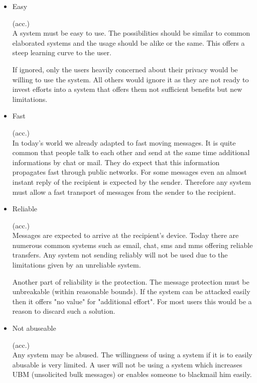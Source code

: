 \documentclass[12pt,journal,compsoc]{IEEEtran}
\begin{document}
\makeatletter
\newcommand{\enumitem}[2]{\item{#2}\hfill\addtocounter{enumi}{1}(\entPrefix.\theenumi)\\}%
\newcommand{\enumref}[1]{\ref{itm:#1}}
\newenvironment{entity}[1]{\def\entPrefix{#1}\setcounter{enumi}{0}\begin{itemize}\itemsep5pt}{\end{itemize}}
\makeatother

\begin{entity}{acc}
	\enumitem{easy}{Easy}
	      A system must be easy to use. The possibilities should be similar to common elaborated systems and the usage should be alike or the same. This offers a steep learning curve to the user.\par
	      If ignored, only the users heavily concerned about their privacy would be willing to use the system. All others would ignore it as they are not ready to invest efforts into a system that offers them not sufficient benefits but new limitations.
	\enumitem{fast}{Fast}
	      In today's world we already adapted to fast moving messages. It is quite common that people talk to each other and send at the same time additional informations by chat or mail. They do expect that this information propagates fast through public networks. For some messages even an almost instant reply of the recipient is expected by the sender. Therefore any system must allow a fast transport of messages from the sender to the recipient.
	\enumitem{reliable}{Reliable}
	      Messages are expected to arrive at the recipient's device. Today there are numerous common systems such as email, chat, sms and mms offering reliable transfers. Any system not sending reliably will not be used due to the limitations given by an unreliable system. \par
	      Another part of reliability is the protection. The message protection must be unbreakable (within reasonable bounds). If the system can be attacked easily then it offers "no value" for "additional effort". For most users this would be a reason to discard such a solution.
	\enumitem{nabuseable}{Not abuseable}
	      Any system may be abused. The willingness of using a system if it is to easily abusable is very limited. A user will not be using a system which increases UBM (unsolicited bulk messages) or enables someone to blackmail him easily.
\end{entity}
\end{document}

